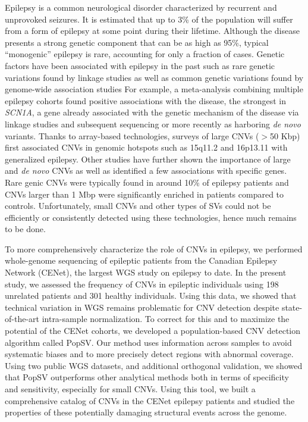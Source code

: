 Epilepsy is a common neurological disorder characterized by recurrent and unprovoked seizures.
It is estimated that up to 3\% of the population will suffer from a form of epilepsy at some point during their lifetime.
Although the disease presents a strong genetic component that can be as high as 95\%, typical ``monogenic'' epilepsy is rare, accounting for only a fraction of cases\cite{Berkovic1998,Zara1995}.
Genetic factors have been associated with epilepsy in the past such as rare genetic variations found by linkage studies as well as common genetic variations found by genome-wide association studies\cite{Kasperaviciute2010a,Guo2012}
For example, a meta-analysis combining multiple epilepsy cohorts found positive associations with the disease\cite{InternationalLeagueAgainstEpilepsyConsortiumonComplexEpilepsies2014}, the strongest in {\it SCN1A}, a gene already associated with the genetic mechanism of the disease via linkage studies and subsequent sequencing\cite{Escayg2000} or more recently as harboring {\it de novo} variants\cite{Claes2003}.
Thanks to array-based technologies, surveys of large CNVs ($>$50 Kbp) first associated CNVs in genomic hotspots such as 15q11.2 and 16p13.11 with generalized epilepsy\cite{Helbig2009,DeKovel2010}.
Other studies have further shown the importance of large and \textit{de novo} CNVs as well as identified a few associations with specific genes\cite{Mefford2010,Helbig2014,Mefford2015,Addis2016,Biervert1998,Lal2015}.
Rare genic CNVs were typically found in around 10\% of epilepsy patients\cite{Mefford2011,Mefford2010,Addis2016} and CNVs larger than 1 Mbp were significantly enriched in patients compared to controls\cite{Mefford2011,Heinzen2010,Striano2012,Lal2015}.
Unfortunately, small CNVs and other types of SVs could not be efficiently or consistently detected using these technologies, hence much remains to be done.

To more comprehensively characterize the role of CNVs in epilepsy, we performed whole-genome sequencing of epileptic patients from the Canadian Epilepsy Network (CENet), the largest WGS study on epilepsy to date.
In the present study, we assessed the frequency of CNVs in epileptic individuals using 198 unrelated patients and 301 healthy individuals. Using this data, we showed that technical variation in WGS remains problematic for CNV detection despite state-of-the-art intra-sample normalization.
To correct for this and to maximize the potential of the CENet cohorts, we developed a population-based CNV detection algorithm called {\sf PopSV}.
Our method uses information across samples to avoid systematic biases and to more precisely detect regions with abnormal coverage.
Using two public WGS datasets\cite{Scelo2014,Boivin2013}, and additional orthogonal validation, we showed that {\sf PopSV} outperforms other analytical methods both in terms of specificity and sensitivity, especially for small CNVs.
Using this tool, we built a comprehensive catalog of CNVs in the CENet epilepsy patients and studied the properties of these potentially damaging structural events across the genome.


